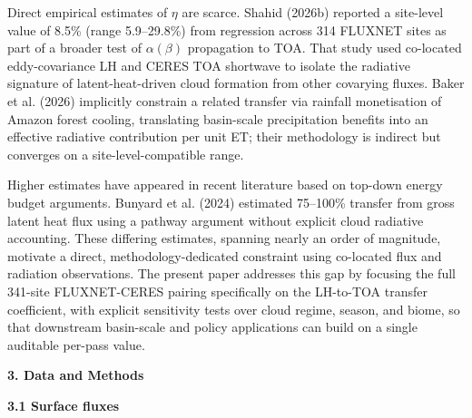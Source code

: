 Direct empirical estimates of $\eta$ are scarce. Shahid (2026b) reported a site-level value of 8.5\% (range 5.9--29.8\%) from regression across 314 FLUXNET sites as part of a broader test of $\alpha(\beta)$ propagation to TOA. That study used co-located eddy-covariance LH and CERES TOA shortwave to isolate the radiative signature of latent-heat-driven cloud formation from other covarying fluxes. Baker et al. (2026) implicitly constrain a related transfer via rainfall monetisation of Amazon forest cooling, translating basin-scale precipitation benefits into an effective radiative contribution per unit ET; their methodology is indirect but converges on a site-level-compatible range.

Higher estimates have appeared in recent literature based on top-down energy budget arguments. Bunyard et al. (2024) estimated 75--100\% transfer from gross latent heat flux using a pathway argument without explicit cloud radiative accounting. These differing estimates, spanning nearly an order of magnitude, motivate a direct, methodology-dedicated constraint using co-located flux and radiation observations. The present paper addresses this gap by focusing the full 341-site FLUXNET-CERES pairing specifically on the LH-to-TOA transfer coefficient, with explicit sensitivity tests over cloud regime, season, and biome, so that downstream basin-scale and policy applications can build on a single auditable per-pass value.

\bigskip

\textbf{3. Data and Methods}

\textbf{3.1 Surface fluxes}

